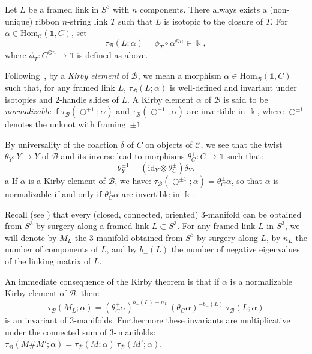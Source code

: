 \documentclass[a4paper]{amsart}
\theoremstyle{definition}
\newcommand{\co}{\colon}
\newcommand{\id}{\mathrm{id}}
\newcommand{\cc}{\mathcal{C}}
\newcommand{\bb}{\mathcal{B}}
\newcommand{\ti}{\mbox{-}\,}
\newcommand{\un}{\mathbb{1}}
\newcommand{\Hom}{\mathrm{Hom}}
\begin{document}
Let $L$ be a framed link in $S^3$ with $n$ components. There always exists a (non-unique) ribbon $n$-string link $T$ such
that $L$ is isotopic to the closure of $T$. For $\alpha \in \Hom_\cc(\un,C)$, set
\begin{equation*}
\tau_\bb(L;\alpha)=\phi_{T} \circ \alpha^{\otimes n} \in \Bbbk,
\end{equation*}
where $\phi_{T}\co C^{\otimes n} \to \un$ is defined as above.

Following~\cite{Vir}, by a \emph{Kirby element} of $\bb$, we mean a morphism $\alpha \in \Hom_\bb(\un,C)$ such that, for any
framed link $L$, $\tau_\bb(L;\alpha)$ is well-defined and invariant under isotopies and 2-handle slides of $L$. A Kirby
element $\alpha$ of $\bb$ is said to be \emph{normalizable} if $\tau_\bb(\bigcirc^{+1};\alpha)$ and
$\tau_\bb(\bigcirc^{-1};\alpha)$ are invertible in $\Bbbk$, where $\bigcirc^{\pm 1}$ denotes the unknot with framing~$\pm
1$.

By universality of the coaction $\delta$ of $C$ on objects of $\cc$, we see that the twist $\theta_Y\co Y \to Y$ of $\bb$
and its inverse lead to morphisms $\theta^\pm_C \co C \to \un$ such that:
\begin{equation*}
\theta_Y^{\pm 1}=(\id_Y \otimes \theta^\pm_C)\delta_Y.
\end{equation*}a
If $\alpha$ is a Kirby element of $\bb$, we have: $\tau_\bb(\bigcirc^{\pm 1};\alpha)=\theta^\pm_C \alpha$, so that $\alpha$
is normalizable if and only if $\theta^\pm_C \alpha$ are invertible in $\Bbbk$.

Recall (see \cite{Li}) that every (closed, connected, oriented) 3-manifold can be obtained from $S^3$ by surgery along a
framed link $L \subset S^3$. For any framed link $L$ in $S^3$, we will denote by $M_L$ the 3-manifold obtained from $S^3$ by
surgery along $L$, by $ n_L$ the number of components of $L$, and by $b_-(L)$ the number of negative eigenvalues of the
linking matrix of $L$.

An immediate consequence of the Kirby theorem \cite{Ki} is that if $\alpha$ is a normalizable Kirby element of $\bb$, then:
\begin{equation*}
\tau_\bb(M_L;\alpha)=(\theta^+_C \alpha)^{b_-(L)-n_L}\,  (\theta^-_C \alpha)^{-b_-(L)} \; \tau_\bb(L;\alpha)
\end{equation*}
is an invariant of 3-manifolds. Furthermore these invariants are multiplicative under the connected sum of 3\ti manifolds:
$\tau_\bb(M\# M';\alpha)=\tau_\bb(M;\alpha)\,\tau_\bb(M';\alpha)$.
\end{document}
